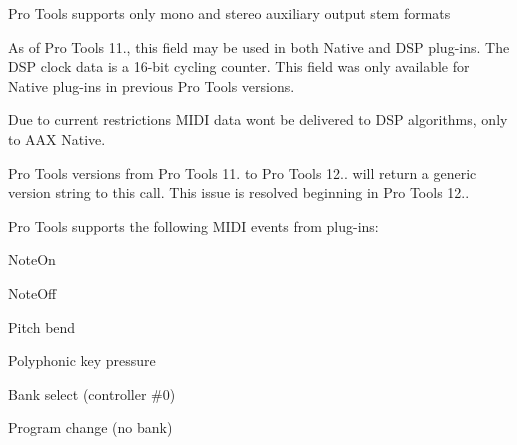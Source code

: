 \begin{DoxyRefList}
\label{a00786__compatibility_notes000056}%
%
 Pro Tools supports only mono and stereo auxiliary output stem formats 
\item[Member \mbox{\hyperlink{a01781_a59727dee1043fcd7f14da130ab254445}{A\+A\+X\+\_\+\+I\+Component\+Descriptor::Add\+Clock}} (A\+A\+X\+\_\+\+C\+Field\+Index in\+Field\+Index)=0]\label{a00786__compatibility_notes000054}%
%
 As of Pro Tools 11., this field may be used in both Native and D\+SP plug-\/ins. The D\+SP clock data is a 16-\/bit cycling counter. This field was only available for Native plug-\/ins in previous Pro Tools versions. 
\item[Member \mbox{\hyperlink{a01781_a6284dda9ccca898e33075de29dad4e39}{A\+A\+X\+\_\+\+I\+Component\+Descriptor::Add\+M\+I\+D\+I\+Node}} (A\+A\+X\+\_\+\+C\+Field\+Index in\+Field\+Index, A\+A\+X\+\_\+\+E\+M\+I\+D\+I\+Node\+Type in\+Node\+Type, const char in\+Node\+Name\mbox{[}\mbox{]}, uint32\+\_\+t channel\+Mask)=0]\label{a00786__compatibility_notes000057}%
%
 Due to current restrictions M\+I\+DI data won\textquotesingle{}t be delivered to D\+SP algorithms, only to A\+AX Native. 
\item[Member \mbox{\hyperlink{a01789_ad2a002a133491b2ed572054588641e78}{A\+A\+X\+\_\+\+I\+Controller::Get\+Host\+Name}} (\mbox{\hyperlink{a01873}{A\+A\+X\+\_\+\+I\+String}} $\ast$out\+Host\+Name\+String) const =0]\label{a00786__compatibility_notes000058}%
%
 Pro Tools versions from Pro Tools 11. to Pro Tools 12.. will return a generic version string to this call. This issue is resolved beginning in Pro Tools 12.. 
\item[Member \mbox{\hyperlink{a01845_a5e1c5409158164f57376f908c9693a8b}{A\+A\+X\+\_\+\+I\+M\+I\+D\+I\+Node::Post\+M\+I\+D\+I\+Packet}} (\mbox{\hyperlink{a01429}{A\+A\+X\+\_\+\+C\+Midi\+Packet}} $\ast$packet)=0]\label{a00786__compatibility_notes000059}%
%
 Pro Tools supports the following M\+I\+DI events from plug-\/ins\+:
\begin{DoxyItemize}
\item Note\+On
\item Note\+Off
\item Pitch bend
\item Polyphonic key pressure
\item Bank select (controller \#0)
\item Program change (no bank)

\end{DoxyItemize}
\end{DoxyRefList}

